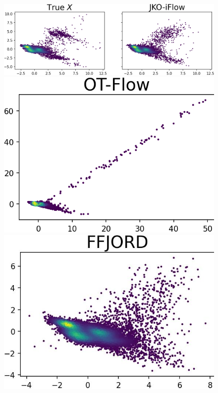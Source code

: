 \documentclass{article}
\theoremstyle{remark}
\theoremstyle{plain}
\begin{document}
{%
\begin{figure}[!t]
    \centering
    \vspace{0.2in}
    \begin{minipage}{0.335\textwidth}
        \includegraphics[width=\linewidth]{power_PCA_2D_compare.png}
    \end{minipage}
    \begin{minipage}{0.155\textwidth}
    \vspace{-0.2in}
    \includegraphics[width=\linewidth]{power_PCA_2D_compare_OTFlow.png}
    \end{minipage}
    \begin{minipage}{0.155\textwidth}
        \vspace{-0.2in}\includegraphics[width=\linewidth]{power_PCA_2D_compare_FFJORD.png}

\end{minipage}
\end{figure}}
\end{document}
